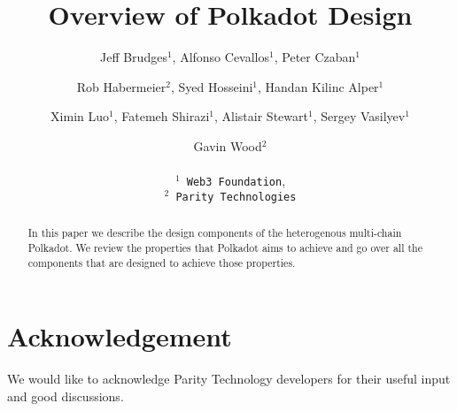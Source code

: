 \documentclass{article}
\title{Overview of Polkadot Design}
\author{
  Jeff Brudges$^1$, Alfonso Cevallos$^1$, Peter Czaban$^1$\\
  \and
  Rob Habermeier$^2$, Syed Hosseini$^1$, Handan Kilinc Alper$^1$\\
  \and
  Ximin Luo$^1$, Fatemeh Shirazi$^1$, Alistair Stewart$^1$, Sergey Vasilyev$^1$\\
  \and
  Gavin Wood$^2$\\
  \\
  \texttt{$^1$ Web3 Foundation},\\
  \texttt{$^2$ Parity Technologies}
}
\begin{document}
\maketitle

\begin{abstract}
In this paper we describe the design components of the heterogenous multi-chain Polkadot.
We review the properties that Polkadot aims to achieve and go over all the components that are designed to achieve those properties.

\end{abstract}

\tableofcontents
\newpage


 

%

\section*{Acknowledgement}
We would like to acknowledge Parity Technology developers for their useful input and good discussions.


\begin{appendix}

\end{appendix}
\end{document}
